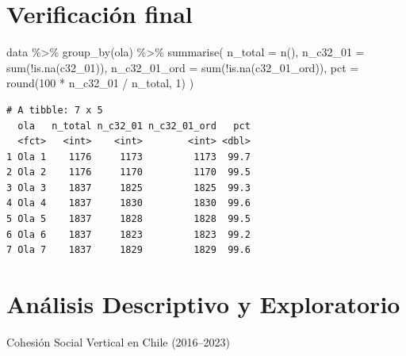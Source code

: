 \documentclass[
  spanish,
  a4paper,
  oneside]{scrbook}
\newenvironment{Shaded}{\begin{snugshade}}{\end{snugshade}}
\newcommand{\AttributeTok}[1]{\textcolor[rgb]{0.40,0.45,0.13}{#1}}
\newcommand{\DecValTok}[1]{\textcolor[rgb]{0.68,0.00,0.00}{#1}}
\newcommand{\FunctionTok}[1]{\textcolor[rgb]{0.28,0.35,0.67}{#1}}
\newcommand{\NormalTok}[1]{\textcolor[rgb]{0.00,0.23,0.31}{#1}}
\newcommand{\SpecialCharTok}[1]{\textcolor[rgb]{0.37,0.37,0.37}{#1}}
\begin{document}
\chapter{Verificación final}\label{verificaciuxf3n-final}

\begin{Shaded}
\begin{Highlighting}[]
\NormalTok{data }\SpecialCharTok{\%\textgreater{}\%}
  \FunctionTok{group\_by}\NormalTok{(ola) }\SpecialCharTok{\%\textgreater{}\%}
  \FunctionTok{summarise}\NormalTok{(}
    \AttributeTok{n\_total =} \FunctionTok{n}\NormalTok{(),}
    \AttributeTok{n\_c32\_01 =} \FunctionTok{sum}\NormalTok{(}\SpecialCharTok{!}\FunctionTok{is.na}\NormalTok{(c32\_01)),}
    \AttributeTok{n\_c32\_01\_ord =} \FunctionTok{sum}\NormalTok{(}\SpecialCharTok{!}\FunctionTok{is.na}\NormalTok{(c32\_01\_ord)),}
    \AttributeTok{pct =} \FunctionTok{round}\NormalTok{(}\DecValTok{100} \SpecialCharTok{*}\NormalTok{ n\_c32\_01 }\SpecialCharTok{/}\NormalTok{ n\_total, }\DecValTok{1}\NormalTok{)}
\NormalTok{  )}
\end{Highlighting}
\end{Shaded}

\begin{verbatim}
# A tibble: 7 x 5
  ola   n_total n_c32_01 n_c32_01_ord   pct
  <fct>   <int>    <int>        <int> <dbl>
1 Ola 1    1176     1173         1173  99.7
2 Ola 2    1176     1170         1170  99.5
3 Ola 3    1837     1825         1825  99.3
4 Ola 4    1837     1830         1830  99.6
5 Ola 5    1837     1828         1828  99.5
6 Ola 6    1837     1823         1823  99.2
7 Ola 7    1837     1829         1829  99.6
\end{verbatim}

\chapter{Análisis Descriptivo y
Exploratorio}\label{anuxe1lisis-descriptivo-y-exploratorio}

Cohesión Social Vertical en Chile (2016--2023)

\hfill\break
\end{document}
